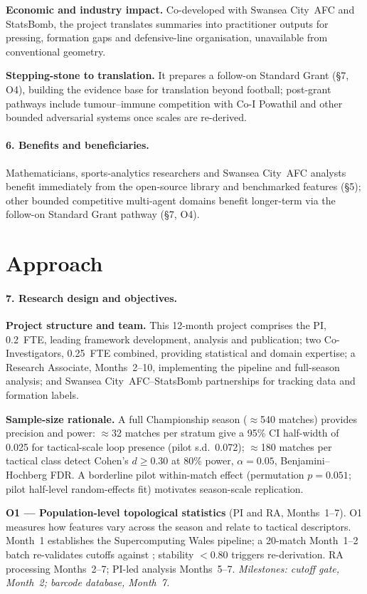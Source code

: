 \textbf{Economic and industry impact.} Co-developed with Swansea City~AFC and StatsBomb, the project translates summaries into practitioner outputs for pressing, formation gaps and defensive-line organisation, unavailable from conventional geometry.

\textbf{Stepping-stone to translation.} It prepares a follow-on Standard Grant (\S7, O4), building the evidence base for translation beyond football; post-grant pathways include tumour--immune competition with Co-I Powathil and other bounded adversarial systems once scales are re-derived.

\paragraph{6. Benefits and beneficiaries.}
Mathematicians, sports-analytics researchers and Swansea City~AFC analysts benefit immediately from the open-source library and benchmarked features (\S5); other bounded competitive multi-agent domains benefit longer-term via the follow-on Standard Grant pathway (\S7, O4).

\section*{Approach}

\paragraph{7. Research design and objectives.}
\textbf{Project structure and team.} This 12-month project comprises the PI, 0.2~FTE, leading framework development, analysis and publication; two Co-Investigators, 0.25~FTE combined, providing statistical and domain expertise; a Research Associate, Months~2--10, implementing the pipeline and full-season analysis; and Swansea City~AFC--StatsBomb partnerships for tracking data and formation labels.

\textbf{Sample-size rationale.} A full Championship season ($\approx$540 matches) provides precision and power: $\approx$32 matches per stratum give a 95\% CI half-width of 0.025 for tactical-scale loop presence (pilot s.d.\ 0.072); $\approx$180 matches per tactical class detect Cohen's $d \ge 0.30$ at 80\% power, $\alpha = 0.05$, Benjamini--Hochberg FDR. A borderline pilot within-match effect (permutation $p = 0.051$; pilot half-level random-effects fit) motivates season-scale replication.

\textbf{O1 --- Population-level topological statistics} (PI and RA, Months~1--7). O1 measures how features vary across the season and relate to tactical descriptors. Month~1 establishes the Supercomputing Wales pipeline; a 20-match Month~1--2 batch re-validates cutoffs against \citep{Brown2026}; stability $< 0.80$ triggers re-derivation. RA processing Months~2--7; PI-led analysis Months~5--7. \emph{Milestones: cutoff gate, Month~2; barcode database, Month~7.}

